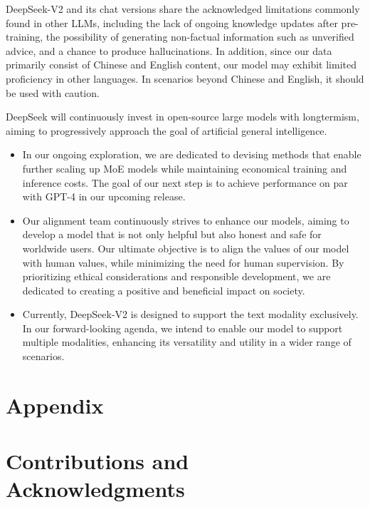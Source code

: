 \documentclass[11pt, a4paper, logo, copyright, nonumbering]{deepseek}
\newcommand{\dsvii}{DeepSeek-V2}
\begin{document}
\begin{CJK*}{UTF8}{gbsn}
\dsvii{} and its chat versions share the acknowledged limitations commonly found in other LLMs, including the lack of ongoing knowledge updates after pre-training, the possibility of generating non-factual information such as unverified advice, and a chance to produce hallucinations. 
In addition, since our data primarily consist of Chinese and English content, our model may exhibit limited proficiency in other languages. 
In scenarios beyond Chinese and English, it should be used with caution.

DeepSeek will continuously invest in open-source large models with longtermism, aiming to progressively approach the goal of artificial general intelligence.
\begin{itemize}
    \item 
    In our ongoing exploration, we are dedicated to devising methods that enable further scaling up MoE models while maintaining economical training and inference costs. 
    The goal of our next step is to achieve performance on par with GPT-4 in our upcoming release.
    \item 
    Our alignment team continuously strives to enhance our models, aiming to develop a model that is not only helpful but also honest and safe for worldwide users. 
    Our ultimate objective is to align the values of our model with human values, while minimizing the need for human supervision. 
    By prioritizing ethical considerations and responsible development, we are dedicated to creating a positive and beneficial impact on society.  
    \item 
    Currently, \dsvii{} is designed to support the text modality exclusively. 
    In our forward-looking agenda, we intend to enable our model to support multiple modalities, enhancing its versatility and utility in a wider range of scenarios.
\end{itemize}



\newpage
\appendix

\section*{Appendix}

\section{Contributions and Acknowledgments}


\end{CJK*}
\end{document}
